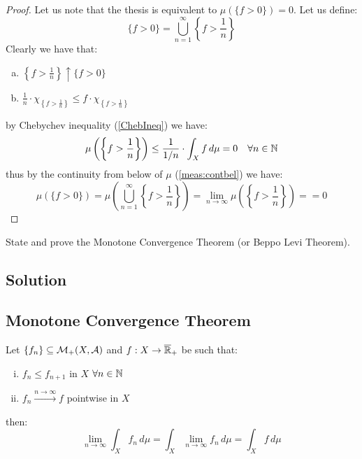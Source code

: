 \begin{proof}
    Let us note that the thesis is equivalent to $\mu(\{ f > 0\}) = 0$. Let us define:
    \[
        \{ f > 0 \} = \bigcup_{n=1}^\infty \left\{ f > \frac{1}{n} \right\}    
    \]
    Clearly we have that:
    \begin{enumerate}[a)]
        \item $\left\{ f > \frac{1}{n} \right\} \uparrow \{ f > 0 \}$
        \item $\frac{1}{n} \cdot \chi_{\left\{ f > \frac{1}{n} \right\}} \leq f \cdot \chi_{\left\{ f > \frac{1}{n} \right\}}$
    \end{enumerate}
    by Chebychev inequality (\ref{ChebIneq}) we have:
    \[
        \mu \left( \left\{ f > \frac{1}{n} \right\} \right) \leq \frac{1}{1/n} \cdot \int_X f \, d\mu = 0 \quad \forall n\in\mathbb{N}
    \]
    thus by the continuity from below of $\mu$ (\ref{meas:contbel}) we have:
    \[
        \mu(\{ f > 0 \}) = \mu \left( \bigcup_{n=1}^\infty \left\{ f > \frac{1}{n} \right\} \right) = \lim_{n\to\infty} \mu \left( \left\{ f > \frac{1}{n} \right\} \right) = = 0
    \]
\end{proof}


\question

State and prove the Monotone Convergence Theorem (or Beppo Levi Theorem).

\subsection*{Solution}

\subsection{Monotone Convergence Theorem}\label{MCT}
Let $\{ f_n \} \subseteq \mathcal{M}_+(X,\mathcal{A})$ and $f:X\to\overline{\mathbb{R}}_{+}$ be such that:
\begin{enumerate}[i)]
    \item $f_n \leq f_{n+1}$ in $X$ $\forall n\in\mathbb{N}$
    \item $f_n \xrightarrow{n\to\infty} f$ pointwise in $X$
\end{enumerate}
then:
\[
    \lim_{n\to\infty} \int_X f_n \, d\mu = \int_X \lim_{n\to\infty} f_n \, d\mu =\int_X f \, d\mu    
\]

